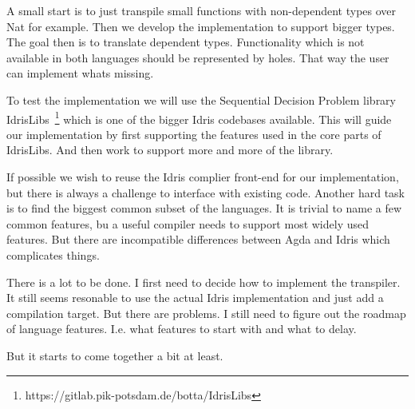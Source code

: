 \documentclass{scrartcl}
\begin{document}
A small start is to just transpile small functions with non-dependent types
over Nat for example. Then we develop the implementation to support bigger
types. The goal then is to translate dependent types.  Functionality which is
not available in both languages should be represented by holes. That way the
user can implement whats missing.

To test the implementation we will use the Sequential Decision Problem library
IdrisLibs~\footnote{https://gitlab.pik-potsdam.de/botta/IdrisLibs} which is one
of the bigger Idris codebases available. This will guide our implementation by
first supporting the features used in the core parts of IdrisLibs. And then
work to support more and more of the library.

If possible we wish to reuse the Idris complier front-end for our
implementation, but there is always a challenge to interface with existing
code.  Another hard task is to find the biggest common subset of the languages.
It is trivial to name a few common features, bu a useful compiler needs to
support most widely used features. But there are incompatible differences
between Agda and Idris which complicates things.






There is a lot to be done. I first need to decide how to implement the
transpiler. It still seems resonable to use the actual Idris implementation and
just add a compilation target. But there are problems. I still need to figure
out the roadmap of language features. I.e. what features to start with and what
to delay.

But it starts to come together a bit at least.





\end{document}

